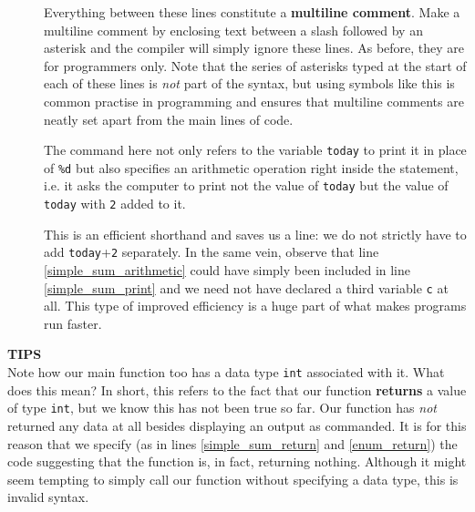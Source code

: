 \documentclass[11pt,oneside]{article}
\newcommand{\eb}[1]{\textbf{\scriptsize{\sffamily\addfontfeatures{LetterSpace=7} #1\\[.35em]}}}
\begin{document}
{{{{{{{\begin{description}
\item[] Everything between these lines constitute a \textbf{multiline comment}. Make a multiline comment by enclosing text between a slash followed by an asterisk  and the compiler will simply ignore these lines. As before, they are for programmers only. Note that the series of asterisks \cbox{*} typed at the start of each of these lines is \textit{not} part of the syntax, but using symbols like this is common practise in programming and ensures that multiline comments are neatly set apart from the main lines of code.

\item[] The  command here not only refers to the variable \verb+today+ to print it in place of \verb+%d+ but also specifies an arithmetic operation right inside the  statement, i.e. it asks the computer to print not the value of \verb+today+ but the value of \verb+today+ with \verb+2+ added to it.

This is an efficient shorthand and saves us a line: we do not strictly have to add \verb+today++\verb+2+ separately. In the same vein, observe that line \ref{simple_sum_arithmetic} could have simply been included in line \ref{simple_sum_print} and we need not have declared a third variable \verb+c+ at all. This type of improved efficiency is a huge part of what makes programs run faster.

\end{description}

\begin{errorbox}
\eb{TIPS }
Note how our main function too has a data type \verb+int+ associated with it. What does this mean? In short, this refers to the fact that our  function \textbf{returns} a value of type \verb+int+, but we know this has not been true so far. Our  function has \textit{not} returned any data at all besides displaying an output as commanded. It is for this reason that we specify (as in lines \ref{simple_sum_return} and \ref{enum_return}) the code  suggesting that the  function is, in fact, returning nothing. Although it might seem tempting to simply call our function  without specifying a data type, this is invalid syntax.
\end{errorbox}

}}}}}}}
\end{document}
